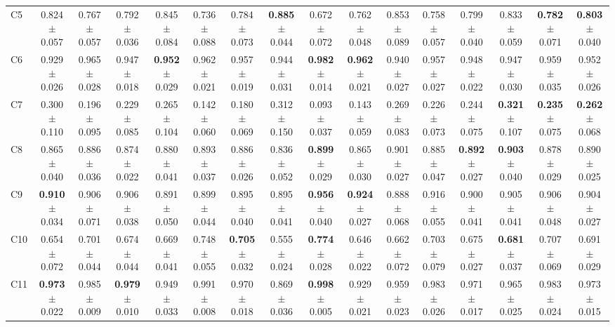 \begin{table}
{\begin{tabular}{lccccccccccccccc}
C5 & 0.824 $\pm$ 0.057 & 0.767 $\pm$ 0.057 & 0.792 $\pm$ 0.036 & 0.845 $\pm$ 0.084 & 0.736 $\pm$ 0.088 & 0.784 $\pm$ 0.073 & \textbf{0.885} $\pm$ 0.044 & 0.672 $\pm$ 0.072 & 0.762 $\pm$ 0.048 & 0.853 $\pm$ 0.089 & 0.758 $\pm$ 0.057 & 0.799 $\pm$ 0.040 & 0.833 $\pm$ 0.059 & \textbf{0.782} $\pm$ 0.071 & \textbf{0.803} $\pm$ 0.040 \\
C6 & 0.929 $\pm$ 0.026 & 0.965 $\pm$ 0.028 & 0.947 $\pm$ 0.018 & \textbf{0.952} $\pm$ 0.029 & 0.962 $\pm$ 0.021 & 0.957 $\pm$ 0.019 & 0.944 $\pm$ 0.031 & \textbf{0.982} $\pm$ 0.014 & \textbf{0.962} $\pm$ 0.021 & 0.940 $\pm$ 0.027 & 0.957 $\pm$ 0.027 & 0.948 $\pm$ 0.022 & 0.947 $\pm$ 0.030 & 0.959 $\pm$ 0.035 & 0.952 $\pm$ 0.026 \\
C7 & 0.300 $\pm$ 0.110 & 0.196 $\pm$ 0.095 & 0.229 $\pm$ 0.085 & 0.265 $\pm$ 0.104 & 0.142 $\pm$ 0.060 & 0.180 $\pm$ 0.069 & 0.312 $\pm$ 0.150 & 0.093 $\pm$ 0.037 & 0.143 $\pm$ 0.059 & 0.269 $\pm$ 0.083 & 0.226 $\pm$ 0.073 & 0.244 $\pm$ 0.075 & \textbf{0.321} $\pm$ 0.107 & \textbf{0.235} $\pm$ 0.075 & \textbf{0.262} $\pm$ 0.068 \\
C8 & 0.865 $\pm$ 0.040 & 0.886 $\pm$ 0.036 & 0.874 $\pm$ 0.022 & 0.880 $\pm$ 0.041 & 0.893 $\pm$ 0.037 & 0.886 $\pm$ 0.026 & 0.836 $\pm$ 0.052 & \textbf{0.899} $\pm$ 0.029 & 0.865 $\pm$ 0.030 & 0.901 $\pm$ 0.027 & 0.885 $\pm$ 0.047 & \textbf{0.892} $\pm$ 0.027 & \textbf{0.903} $\pm$ 0.040 & 0.878 $\pm$ 0.029 & 0.890 $\pm$ 0.025 \\
C9 & \textbf{0.910} $\pm$ 0.034 & 0.906 $\pm$ 0.071 & 0.906 $\pm$ 0.038 & 0.891 $\pm$ 0.050 & 0.899 $\pm$ 0.044 & 0.895 $\pm$ 0.040 & 0.895 $\pm$ 0.041 & \textbf{0.956} $\pm$ 0.040 & \textbf{0.924} $\pm$ 0.027 & 0.888 $\pm$ 0.068 & 0.916 $\pm$ 0.055 & 0.900 $\pm$ 0.041 & 0.905 $\pm$ 0.041 & 0.906 $\pm$ 0.048 & 0.904 $\pm$ 0.027 \\
C10 & 0.654 $\pm$ 0.072 & 0.701 $\pm$ 0.044 & 0.674 $\pm$ 0.044 & 0.669 $\pm$ 0.041 & 0.748 $\pm$ 0.055 & \textbf{0.705} $\pm$ 0.032 & 0.555 $\pm$ 0.024 & \textbf{0.774} $\pm$ 0.028 & 0.646 $\pm$ 0.022 & 0.662 $\pm$ 0.072 & 0.703 $\pm$ 0.079 & 0.675 $\pm$ 0.027 & \textbf{0.681} $\pm$ 0.037 & 0.707 $\pm$ 0.069 & 0.691 $\pm$ 0.029 \\
C11 & \textbf{0.973} $\pm$ 0.022 & 0.985 $\pm$ 0.009 & \textbf{0.979} $\pm$ 0.010 & 0.949 $\pm$ 0.033 & 0.991 $\pm$ 0.008 & 0.970 $\pm$ 0.018 & 0.869 $\pm$ 0.036 & \textbf{0.998} $\pm$ 0.005 & 0.929 $\pm$ 0.021 & 0.959 $\pm$ 0.023 & 0.983 $\pm$ 0.026 & 0.971 $\pm$ 0.017 & 0.965 $\pm$ 0.025 & 0.983 $\pm$ 0.024 & 0.973 $\pm$ 0.015 \\

\end{tabular}}
\end{table}
